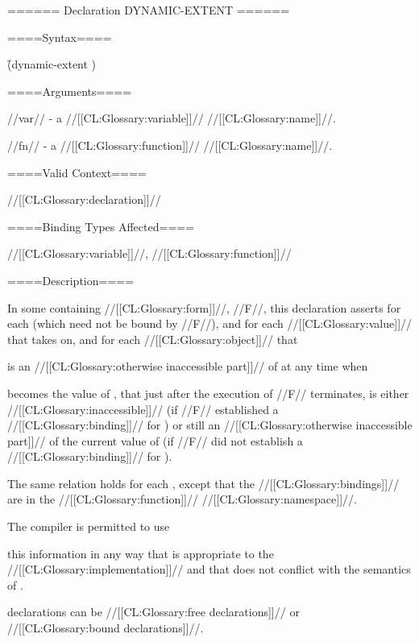 ====== Declaration DYNAMIC-EXTENT ======

====Syntax====

\f{(dynamic-extent )}

====Arguments====

//var// - a //[[CL:Glossary:variable]]// //[[CL:Glossary:name]]//.

//fn// - a //[[CL:Glossary:function]]// //[[CL:Glossary:name]]//.

====Valid Context====

//[[CL:Glossary:declaration]]//

====Binding Types Affected====

//[[CL:Glossary:variable]]//, //[[CL:Glossary:function]]//

====Description====

In some containing //[[CL:Glossary:form]]//, //F//, this declaration asserts for each  (which need not be bound by //F//), and for each //[[CL:Glossary:value]]//  that  takes on, and for each //[[CL:Glossary:object]]//  that

is an //[[CL:Glossary:otherwise inaccessible part]]// of  at any time when

 becomes the value of , that just after the execution of //F// terminates,  is either //[[CL:Glossary:inaccessible]]// (if //F// established a //[[CL:Glossary:binding]]// for ) or still an //[[CL:Glossary:otherwise inaccessible part]]// of the current value of  (if //F// did not establish a //[[CL:Glossary:binding]]// for ).

The same relation holds for each , except that the //[[CL:Glossary:bindings]]// are in the //[[CL:Glossary:function]]// //[[CL:Glossary:namespace]]//.

The compiler is permitted to use

this information in any way that is appropriate to the //[[CL:Glossary:implementation]]// and that does not conflict with the semantics of \clisp.

 declarations can be //[[CL:Glossary:free declarations]]// or //[[CL:Glossary:bound declarations]]//.

